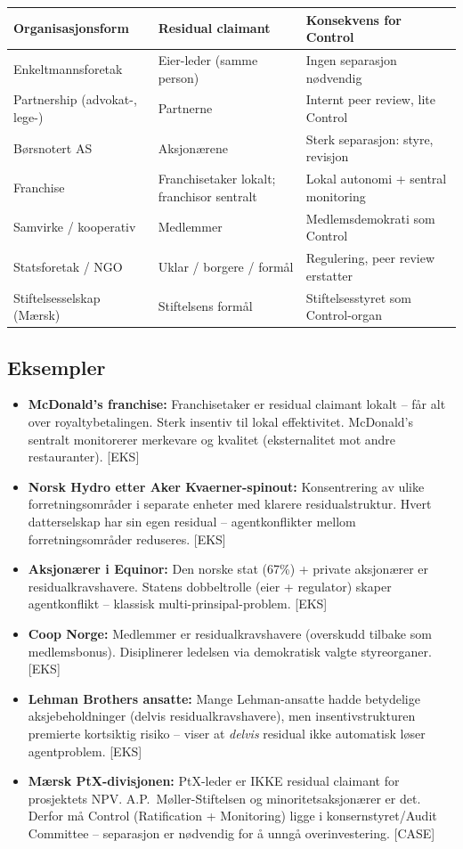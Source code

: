 \begin{center}
\renewcommand{\arraystretch}{1.15}
\begin{tabular}{@{}p{3.7cm}p{4.4cm}p{5.5cm}@{}}
\toprule
\textbf{Organisasjonsform} & \textbf{Residual claimant} & \textbf{Konsekvens for Control} \\
\midrule
Enkeltmannsforetak & Eier-leder (samme person) & Ingen separasjon nødvendig \\
Partnership (advokat-, lege-) & Partnerne & Internt peer review, lite Control \\
Børsnotert AS & Aksjonærene & Sterk separasjon: styre, revisjon \\
Franchise & Franchisetaker lokalt; franchisor sentralt & Lokal autonomi + sentral monitoring \\
Samvirke / kooperativ & Medlemmer & Medlemsdemokrati som Control \\
Statsforetak / NGO & Uklar / borgere / formål & Regulering, peer review erstatter \\
Stiftelsesselskap (Mærsk) & Stiftelsens formål & Stiftelsesstyret som Control-organ \\
\bottomrule
\end{tabular}
\end{center}

\subsection*{Eksempler}
\begin{itemize}
\item \textbf{McDonald's franchise:} Franchisetaker er residual claimant lokalt -- får alt over royaltybetalingen. Sterk insentiv til lokal effektivitet. McDonald's sentralt monitorerer merkevare og kvalitet (eksternalitet mot andre restauranter). [EKS]
\item \textbf{Norsk Hydro etter Aker Kvaerner-spinout:} Konsentrering av ulike forretningsområder i separate enheter med klarere residualstruktur. Hvert datterselskap har sin egen residual -- agentkonflikter mellom forretningsområder reduseres. [EKS]
\item \textbf{Aksjonærer i Equinor:} Den norske stat (67\%) + private aksjonærer er residualkravshavere. Statens dobbeltrolle (eier + regulator) skaper agentkonflikt -- klassisk multi-prinsipal-problem. [EKS]
\item \textbf{Coop Norge:} Medlemmer er residualkravshavere (overskudd tilbake som medlemsbonus). Disiplinerer ledelsen via demokratisk valgte styreorganer. [EKS]
\item \textbf{Lehman Brothers ansatte:} Mange Lehman-ansatte hadde betydelige aksjebeholdninger (delvis residualkravshavere), men insentivstrukturen premierte kortsiktig risiko -- viser at \emph{delvis} residual ikke automatisk løser agentproblem. [EKS]
\item \textbf{Mærsk PtX-divisjonen:} PtX-leder er IKKE residual claimant for prosjektets NPV. A.P.\ Møller-Stiftelsen og minoritetsaksjonærer er det. Derfor må Control (Ratification + Monitoring) ligge i konsernstyret/Audit Committee -- separasjon er nødvendig for å unngå overinvestering. [CASE]
\end{itemize}

